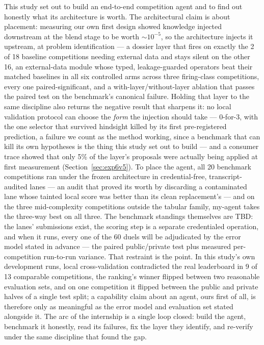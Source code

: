 \documentclass[11pt,a4paper]{article}
\begin{document}
This study set out to build an end-to-end competition agent and to find out honestly what its architecture is worth. The architectural claim is about placement: measuring our own first design showed knowledge injected downstream at the blend stage to be worth ${\sim}10^{-5}$, so the architecture injects it upstream, at problem identification --- a dossier layer that fires on exactly the 2 of 18 baseline competitions needing external data and stays silent on the other 16, an external-data module whose typed, leakage-guarded operators beat their matched baselines in all six controlled arms across three firing-class competitions, every one paired-significant, and a with-layer/without-layer ablation that passes the paired test on the benchmark's canonical failure. Holding that layer to the same discipline also returns the negative result that sharpens it: no local validation protocol can choose the \emph{form} the injection should take --- 0-for-3, with the one selector that survived hindsight killed by its first pre-registered prediction, a failure we count as the method working, since a benchmark that can kill its own hypotheses is the thing this study set out to build --- and a consumer trace showed that only 5\% of the layer's proposals were actually being applied at first measurement (Section~\ref{sec:exp6v5}). To place the agent, all 20 benchmark competitions ran under the frozen architecture in credential-free, transcript-audited lanes --- an audit that proved its worth by discarding a contaminated lane whose tainted local score was better than its clean replacement's --- and on the three mid-complexity competitions outside the tabular family, my-agent takes the three-way best on all three. The benchmark standings themselves are TBD: the lanes' submissions exist, the scoring step is a separate credentialed operation, and when it runs, every one of the 60 duels will be adjudicated by the error model stated in advance --- the paired public/private test plus measured per-competition run-to-run variance. That restraint is the point. In this study's own development runs, local cross-validation contradicted the real leaderboard in 9 of 13 comparable competitions, the ranking's winner flipped between two reasonable evaluation sets, and on one competition it flipped between the public and private halves of a single test split; a capability claim about an agent, ours first of all, is therefore only as meaningful as the error model and evaluation set stated alongside it. The arc of the internship is a single loop closed: build the agent, benchmark it honestly, read its failures, fix the layer they identify, and re-verify under the same discipline that found the gap.
\end{document}
